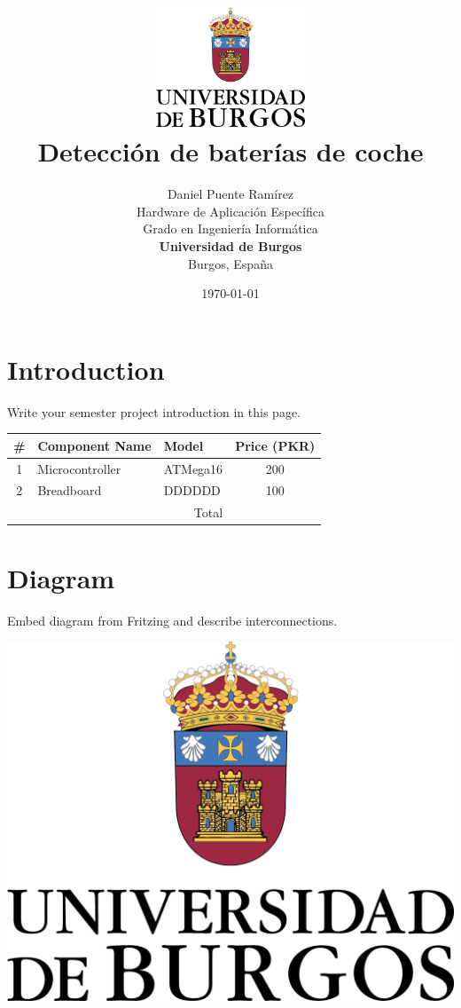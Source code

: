\documentclass[11pt]{report}
\title{
\includegraphics[width=1.75in]{./img/Escudo.PNG} \\
\vspace*{1in}
\textbf{Detección de baterías de coche}}
\author{Daniel Puente Ramírez
		\vspace*{1.5in} \\
		Hardware de Aplicación Específica\\
		Grado en Ingeniería Informática\\
        \textbf{Universidad de Burgos}\\
        Burgos, España
       } \date{\today}
\begin{document}
\maketitle
\clearpage
\thispagestyle{empty}
\tableofcontents
\thispagestyle{empty}
\newpage


\section{Introduction}
\setcounter{page}{1}
Write your semester project introduction in this page. 

\centering 

\begin{tabular}{|c|l|l|c|}
    \hline
    \# & Component Name & Model & Price (PKR) \\
    \hline
    1 & Microcontroller & ATMega16 & 200 \\
    \hline
    2 & Breadboard & DDDDDD & 100 \\
    \hline
    \multicolumn{3}{|r|}{Total} & \\ 
    \hline 
\end{tabular}

\section{Diagram}

Embed diagram from Fritzing and describe interconnections.

\includegraphics[width=6in]{./img/escudo}
    
\end{document}
